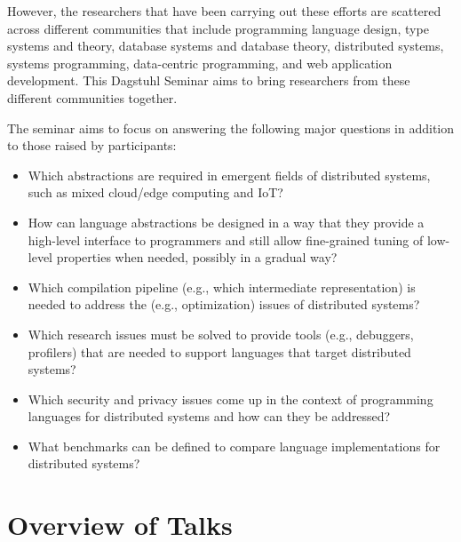 \documentclass[a4paper,UKenglish]{dagrep-v2018}
\begin{document}
However, the researchers that have been carrying out these efforts are scattered across different communities that include programming language design, type systems and theory, database systems and database theory, distributed systems, systems programming, data-centric programming, and web application development. This Dagstuhl Seminar aims to bring researchers from these different communities together.

The seminar aims to focus on answering the following major questions in addition to those raised by participants:

\begin{itemize}

\item Which abstractions are required in emergent fields of distributed systems, such as mixed cloud/edge computing and IoT?

\item How can language abstractions be designed in a way that they provide a high-level interface to programmers and still allow fine-grained tuning of low-level properties when needed, possibly in a gradual way?

\item Which compilation pipeline (e.g., which intermediate representation) is needed to address the (e.g., optimization) issues of distributed systems?

\item Which research issues must be solved to provide tools (e.g., debuggers, profilers) that are needed to support languages that target distributed systems?

\item Which security and privacy issues come up in the context of programming languages for distributed systems and how can they be addressed?

\item What benchmarks can be defined to compare language implementations for distributed systems?

\end{itemize}

\tableofcontents


\section{Overview of Talks}
\end{document}

